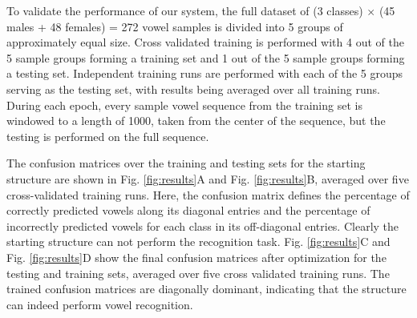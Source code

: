 To validate the performance of our system, the full dataset of (3 classes) $\times$ (45 males + 48 females) = 272 vowel samples is divided into 5 groups of approximately equal size.
Cross validated training is performed with 4 out of the 5 sample groups forming a training set and 1 out of the 5 sample groups forming a testing set.
Independent training runs are performed with each of the 5 groups serving as the testing set, with results being averaged over all training runs. 
During each epoch, every sample vowel sequence from the training set is windowed to a length of 1000, taken from the center of the sequence, but the testing is performed on the full sequence.



The confusion matrices over the training and testing sets for the starting structure are shown in Fig. \ref{fig:results}A and Fig. \ref{fig:results}B, averaged over five cross-validated training runs.
Here, the confusion matrix defines the percentage of correctly predicted vowels along its diagonal entries and the percentage of incorrectly predicted vowels for each class in its off-diagonal entries.
Clearly the starting structure can not perform the recognition task.
Fig. \ref{fig:results}C and Fig. \ref{fig:results}D show the final confusion matrices after optimization for the testing and training sets, averaged over five cross validated training runs.
The trained confusion matrices are diagonally dominant, indicating that the structure can indeed perform vowel recognition.

